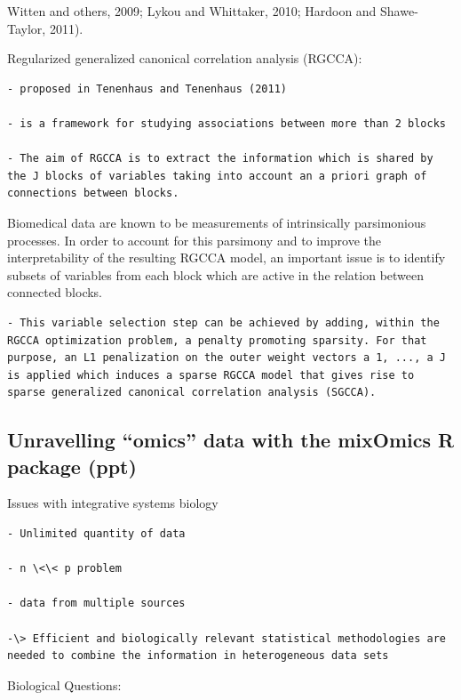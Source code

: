 \documentclass[
]{book}
\begin{document}
Witten and others, 2009; Lykou and Whittaker, 2010; Hardoon and Shawe-Taylor, 2011).

Regularized generalized canonical correlation analysis (RGCCA):

\begin{verbatim}
- proposed in Tenenhaus and Tenenhaus (2011)

- is a framework for studying associations between more than 2 blocks

- The aim of RGCCA is to extract the information which is shared by the J blocks of variables taking into account an a priori graph of connections between blocks.
\end{verbatim}

Biomedical data are known to be measurements of intrinsically parsimonious processes. In order to account for this parsimony and to improve the interpretability of the resulting RGCCA model, an important issue is to identify subsets of variables from each block which are active in the relation between connected blocks.

\begin{verbatim}
- This variable selection step can be achieved by adding, within the RGCCA optimization problem, a penalty promoting sparsity. For that purpose, an L1 penalization on the outer weight vectors a 1, ..., a J is applied which induces a sparse RGCCA model that gives rise to sparse generalized canonical correlation analysis (SGCCA).
\end{verbatim}

\hypertarget{unravelling-omics-data-with-the-mixomics-r-package-ppt}{%
\subsection{Unravelling ``omics'' data with the mixOmics R package (ppt)}\label{unravelling-omics-data-with-the-mixomics-r-package-ppt}}

Issues with integrative systems biology

\begin{verbatim}
- Unlimited quantity of data

- n \<\< p problem

- data from multiple sources

-\> Efficient and biologically relevant statistical methodologies are needed to combine the information in heterogeneous data sets
\end{verbatim}

Biological Questions:
\end{document}
